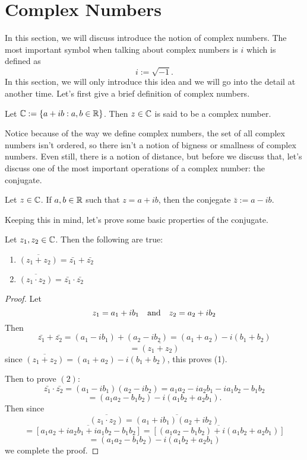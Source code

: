 \section{Complex Numbers}
In this section, we will discuss introduce the notion of complex numbers. The most important symbol when talking about complex numbers is $i$ which is defined as
$$i:=\sqrt{-1}.$$
In this section, we will only introduce this idea and we will go into the detail at another time. Let's first give a brief definition of complex numbers.

\begin{define}
	Let $\mathbb{C}:=\{a+ib:a,b\in\mathbb{R}\}$. Then $z\in\mathbb{C}$ is said to be a complex number.
\end{define}

Notice because of the way we define complex numbers, the set of all complex numbers isn't ordered, so there isn't a notion of bigness or smallness of complex numbers. Even still, there is a notion of distance, but before we discuss that, let's discuss one of the most important operations of a complex number: the conjugate.

\begin{define}
Let $z\in\mathbb{C}$. If $a,b\in\mathbb{R}$ such that $z=a+ib$, then the conjegate $\bar{z}:=a-ib$.	
\end{define}
Keeping this in mind, let's prove some basic properties of the conjugate. 
\begin{theorem}
\label{thm:conjpassthrough}
Let $z_1,z_2\in\mathbb{C}$. Then the following are true:
\begin{enumerate}
	\item $\overline{(z_1+z_2)}=\bar{z_1}+\bar{z_2}$
	\item $\overline{(z_1\cdot z_2)}=\bar{z_1}\cdot \bar{z_2}$
\end{enumerate}	
\end{theorem}
\begin{proof}
	Let
	$$z_1=a_1+ib_1 \quad\text{and}\quad z_2=a_2+ib_2$$
	Then
	$$\bar{z_1}+\bar{z_2}=(a_1-ib_1)+(a_2-ib_2)=(a_1+a_2)-i(b_1+b_2)$$
	$$=\overline{(z_1+z_2)}$$
	since $\overline{(z_1+z_2)}=(a_1+a_2)-i(b_1+b_2)$, this proves (1).
	
	Then to prove $(2)$:
	$$\bar{z_1}\cdot \bar{z_2}=(a_1-ib_1)(a_2-ib_2)=a_1a_2-ia_2b_1-ia_1b_2-b_1b_2$$
	$$=(a_1a_2-b_1b_2)-i(a_1b_2+a_2b_1).$$
	Then since 
	$$\overline{(z_1\cdot z_2)}=\overline{(a_1+ib_1)(a_2+ib_2)}$$
	$$=\overline{[a_1a_2+ia_2b_1+ia_1b_2-b_1b_2]}=\overline{[(a_1a_2-b_1b_2)+i(a_1b_2+a_2b_1)]}$$
	$$=(a_1a_2-b_1b_2)-i(a_1b_2+a_2b_1)$$
	we complete the proof.
\end{proof}

